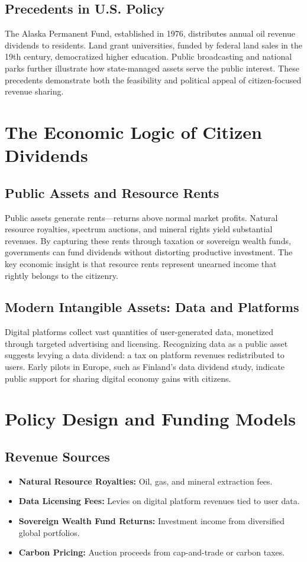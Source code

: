 \documentclass[11pt]{article}
\begin{document}
\subsection{Precedents in U.S. Policy}
The Alaska Permanent Fund, established in 1976, distributes annual oil revenue dividends to residents. Land grant universities, funded by federal land sales in the 19th century, democratized higher education. Public broadcasting and national parks further illustrate how state-managed assets serve the public interest. These precedents demonstrate both the feasibility and political appeal of citizen-focused revenue sharing.

\section{The Economic Logic of Citizen Dividends}
\subsection{Public Assets and Resource Rents}
Public assets generate rents—returns above normal market profits. Natural resource royalties, spectrum auctions, and mineral rights yield substantial revenues. By capturing these rents through taxation or sovereign wealth funds, governments can fund dividends without distorting productive investment. The key economic insight is that resource rents represent unearned income that rightly belongs to the citizenry.

\subsection{Modern Intangible Assets: Data and Platforms}
Digital platforms collect vast quantities of user-generated data, monetized through targeted advertising and licensing. Recognizing data as a public asset suggests levying a data dividend: a tax on platform revenues redistributed to users. Early pilots in Europe, such as Finland’s data dividend study, indicate public support for sharing digital economy gains with citizens.

\section{Policy Design and Funding Models}
\subsection{Revenue Sources}
\begin{itemize}
    \item \textbf{Natural Resource Royalties:} Oil, gas, and mineral extraction fees.
    \item \textbf{Data Licensing Fees:} Levies on digital platform revenues tied to user data.
    \item \textbf{Sovereign Wealth Fund Returns:} Investment income from diversified global portfolios.
    \item \textbf{Carbon Pricing:} Auction proceeds from cap-and-trade or carbon taxes.
\end{itemize}
\end{document}
